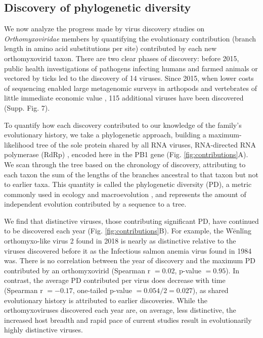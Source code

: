 \documentclass[11pt,twocolumn]{article}
\begin{document}
\begin{figure}
\end{figure}


\subsection{Discovery of phylogenetic diversity}

We now analyze the progress made by virus discovery studies on \textit{Orthomyxoviridae} members by quantifying the evolutionary contribution (branch length in amino acid substitutions per site) contributed by each new orthomyxovirid taxon.
There are two clear phases of discovery: before 2015, public health investigations of pathogens infecting humans and farmed animals or vectored by ticks led to the discovery of 14 viruses. Since 2015, when lower costs of sequencing enabled large metagenomic surveys in arthopods and vertebrates of little immediate economic value \citep{li_unprecedented_2015, shi_evolutionary_2018}, 115 additional viruses have been discovered (Supp. Fig. 7).


To quantify how each discovery contributed to our knowledge of the family's evolutionary history, we take a phylogenetic approach, building a maximum-likelihood tree of the sole protein shared by all RNA viruses, RNA-directed RNA polymerase (RdRp) \citep{koonin_virus_2014}, encoded here in the PB1 gene \citep{kobayashi_influenza_1996} (Fig. \ref{fig:contributions}A). We scan through the tree based on the chronology of discovery, attributing to each taxon the sum of the lengths of the branches ancestral to that taxon but not to earlier taxa. This quantity is called the phylogenetic diversity (PD), a metric commonly used in ecology and macroevolution \citep{lum_tracking_2022}, and represents the amount of independent evolution \citep{felsenstein_phylogenies_1985} contributed by a sequence to a tree.


We find that distinctive viruses, those contributing significant PD, have continued to be discovered each year (Fig. \ref{fig:contributions}B). For example, the W\={e}nl\v{i}ng orthomyxo-like virus 2 found in 2018 is nearly as distinctive relative to the viruses discovered before it as the Infectious salmon anemia virus found in 1984 was. There is no correlation between the year of discovery and the maximum PD contributed by an orthomyxovirid (Spearman r $ = 0.02$, p-value $ = 0.95$). In contrast, the average PD contributed per virus does decrease with time (Spearman r $ = -0.17$, one-tailed p-value $ = 0.054/2=0.027$), as shared evolutionary history is attributed to earlier discoveries. While the orthomyxoviruses discovered each year are, on average, less distinctive, the increased host breadth and rapid pace of current studies result in evolutionarily highly distinctive viruses.
\end{document}
